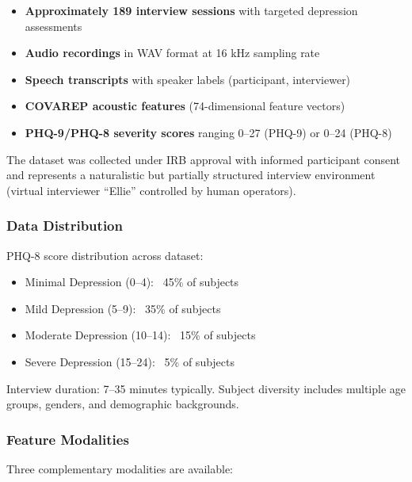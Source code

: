 \documentclass[12pt]{article}
\begin{document}
	\begin{itemize}
		\item \textbf{Approximately 189 interview sessions} with targeted depression assessments
		\item \textbf{Audio recordings} in WAV format at 16 kHz sampling rate
		\item \textbf{Speech transcripts} with speaker labels (participant, interviewer)
		\item \textbf{COVAREP acoustic features} (74-dimensional feature vectors)
		\item \textbf{PHQ-9/PHQ-8 severity scores} ranging 0--27 (PHQ-9) or 0--24 (PHQ-8)
	\end{itemize}

	The dataset was collected under IRB approval with informed participant consent and represents a naturalistic but partially structured interview environment (virtual interviewer ``Ellie'' controlled by human operators).

	\subsubsection{Data Distribution}

	PHQ-8 score distribution across dataset:
	\begin{itemize}
		\item Minimal Depression (0--4): ~45\% of subjects
		\item Mild Depression (5--9): ~35\% of subjects
		\item Moderate Depression (10--14): ~15\% of subjects
		\item Severe Depression (15--24): ~5\% of subjects
	\end{itemize}

	Interview duration: 7--35 minutes typically. Subject diversity includes multiple age groups, genders, and demographic backgrounds.

	\subsubsection{Feature Modalities}

	Three complementary modalities are available:
\end{document}
